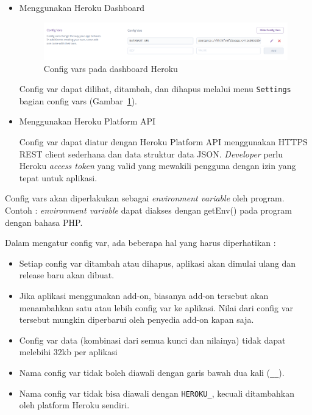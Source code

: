 \documentclass[a4paper,twoside]{article}
\begin{document}
\begin{enumerate}
\begin{enumerate}
\begin{itemize}
\begin{itemize}
\item Menggunakan Heroku Dashboard

\begin{figure}[H]
	\centering  
	\includegraphics[width=\textwidth]{Gambar/bluetape-config-vars-example.png}  
	\caption[Config vars pada dashboard Heroku]{Config vars pada dashboard Heroku} 
	\label{fig:bluetape-config-vars-example} 
\end{figure}

Config var dapat dilihat, ditambah, dan dihapus melalui menu \texttt{Settings} bagian config vars (Gambar~\ref{fig:bluetape-config-vars-example}).

\item Menggunakan Heroku Platform API

Config var dapat diatur dengan Heroku Platform API menggunakan HTTPS REST client sederhana dan data struktur data JSON. \textit{Developer} perlu Heroku \textit{access token} yang valid yang mewakili pengguna dengan izin yang tepat untuk aplikasi.

\end{itemize}

Config vars akan diperlakukan sebagai \textit{environment variable} oleh program. Contoh : \textit{environment variable} dapat diakses dengan getEnv() pada program dengan bahasa PHP.
 
Dalam mengatur config var, ada beberapa hal yang harus diperhatikan :
\begin{itemize}
\item Setiap config var ditambah atau dihapus, aplikasi akan dimulai ulang dan release baru akan dibuat.
\item Jika aplikasi menggunakan add-on, biasanya add-on tersebut akan menambahkan satu atau lebih config var ke aplikasi. Nilai dari config var tersebut mungkin diperbarui oleh penyedia add-on kapan saja.
\item Config var data (kombinasi dari semua kunci dan nilainya) tidak dapat melebihi 32kb per aplikasi
\item Nama config var tidak boleh diawali dengan garis bawah dua kali (\texttt{\_\_}).
\item Nama config var tidak bisa diawali dengan \texttt{HEROKU\_}, kecuali ditambahkan oleh platform Heroku sendiri.
\end{itemize}
		

\end{itemize}
\end{enumerate}
\end{enumerate}
\end{document}
